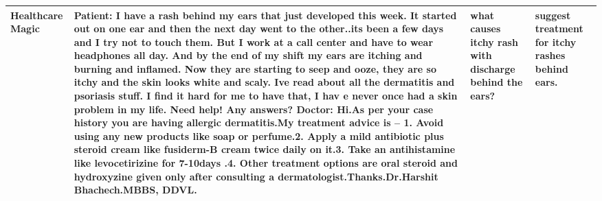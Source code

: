 \documentclass[10pt]{article} \usepackage[preprint]{tmlr}
\begin{document}
\begin{table*}
\begin{tabularx}{\textwidth}{|>{\raggedright\arraybackslash}p{0.7in}|>{\raggedright\arraybackslash}X|>{\raggedright\arraybackslash}p{1.2in}|>{\raggedright\arraybackslash}p{1.2in}|}
    \hline
    Healthcare Magic & Patient: I have a rash behind my ears that just developed this week. It started out on one ear and then the next day went to the other..its been a few days and I try not to touch them. But I work at a call center and have to wear headphones all day. And by the end of my shift my ears are itching and burning and inflamed. Now they are starting to seep and ooze, they are so itchy and the skin looks white and scaly. Ive read about all the dermatitis and psoriasis stuff. I find it hard for me to have that, I hav e never once had a skin problem in my life. Need help! Any answers? Doctor: Hi.As per your case history you are having allergic dermatitis.My treatment advice is – 1. Avoid using any new products like soap or perfume.2. Apply a mild antibiotic plus steroid cream like fusiderm-B cream twice daily on it.3. Take an antihistamine like levocetirizine for 7-10days .4. Other treatment options are oral steroid and hydroxyzine given only after consulting a dermatologist.Thanks.Dr.Harshit Bhachech.MBBS, DDVL. & what causes itchy rash with discharge behind the ears? & suggest treatment for itchy rashes behind ears. \\
    \hline
    \end{tabularx}
\end{table*}
\end{document}
